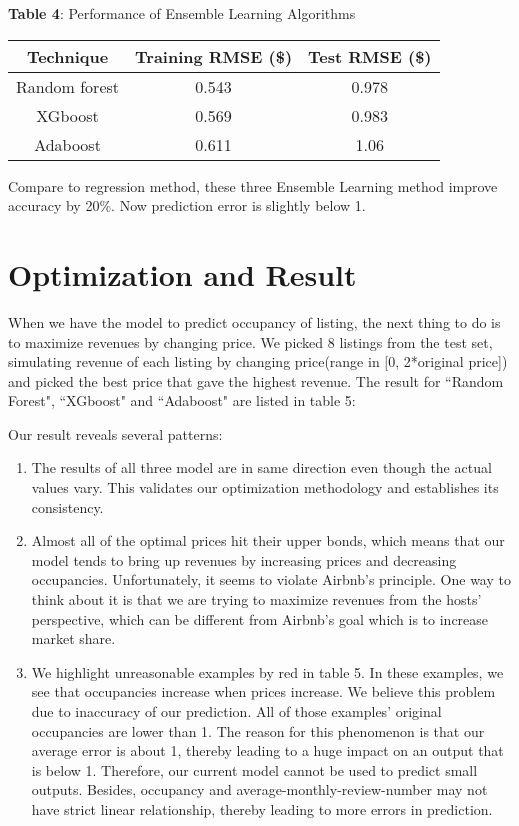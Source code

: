 \documentclass[12pt]{article}
\begin{document}
\begin{center}
\textbf{Table 4}: Performance of Ensemble Learning Algorithms \\[0.3cm] 
\begin{tabular}{ |c|c|c| } 
 
 \hline 

  \textbf{Technique}& \textbf{Training RMSE (\$)}  & \textbf{Test RMSE (\$)} \\ [0.1cm]
 \hline
  Random forest & 0.543 & 0.978 \\ 
 \hline
 XGboost &0.569   &0.983   \\ 
 \hline
 Adaboost   &  0.611 & 1.06 \\
 \hline

\end{tabular}


\end{center}

\noindent Compare to regression method, these three Ensemble Learning method improve accuracy by 20\%. Now prediction error is slightly below 1.

\section*{Optimization and Result}
When we have the model to predict occupancy of listing, the next thing to do is to maximize revenues by changing price. We picked 8 listings from the test set, simulating revenue of each listing by changing price(range in [0, 2*original price]) and picked the best price that gave the highest revenue. The result for ``Random Forest", ``XGboost" and ``Adaboost" are listed in table 5:

\noindent Our result reveals several patterns:
\begin{enumerate}
\item The results of all three model are in same direction even though the actual values vary. This validates our optimization methodology and establishes its consistency. 
\item Almost all of the optimal prices hit their upper bonds, which means that our model tends to bring up revenues by increasing prices and decreasing occupancies. Unfortunately, it seems to violate Airbnb's principle. One way to think about it is that we are trying to maximize revenues from the hosts' perspective, which can be different from Airbnb's goal which is to increase market share.
\item We highlight unreasonable examples by red in table 5. In these examples, we see that occupancies increase when prices increase. We believe this problem due to inaccuracy of our prediction.  All of those examples' original occupancies are lower than 1. The reason for this phenomenon is that our average error is about 1, thereby leading to a huge impact on an output that is below 1. Therefore, our current model cannot be used to predict small outputs. Besides, occupancy and average-monthly-review-number may not have strict linear relationship, thereby leading to more errors in prediction. 

\end{enumerate}
\end{document}
